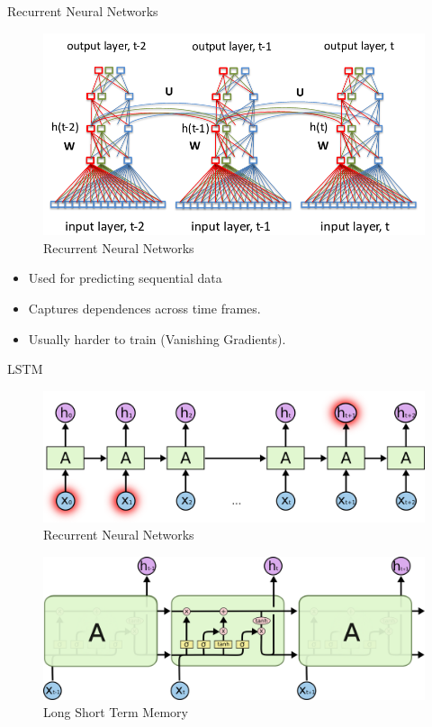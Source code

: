 ﻿\documentclass[aspectratio=43,mathserif,xcolor={usenames,dvipsnames,svgnames,table},10pt]{beamer}
\begin{document}
\begin{frame}{Recurrent Neural Networks}
\begin{figure}[h]
    \includegraphics[width=0.7\linewidth]{images/rnn.png}  
    \caption{Recurrent Neural Networks}
  \end{figure}
  
\begin{itemize}
\item<+-> Used for predicting sequential data 
\item<+-> Captures dependences across time frames.
\item<+-> Usually harder to train (Vanishing Gradients).
\end{itemize}

\end{frame}


\begin{frame}{LSTM}
 \begin{figure}[h]
    \includegraphics[width=0.4\linewidth]{images/rnn_n.png}  
    \caption{Recurrent Neural Networks}
  \end{figure}
   \begin{figure}[h]
    \includegraphics[width=0.6\linewidth]{images/lstm.png}  
    \caption{Long Short Term Memory}
  \end{figure}
\end{frame}
\end{document}
